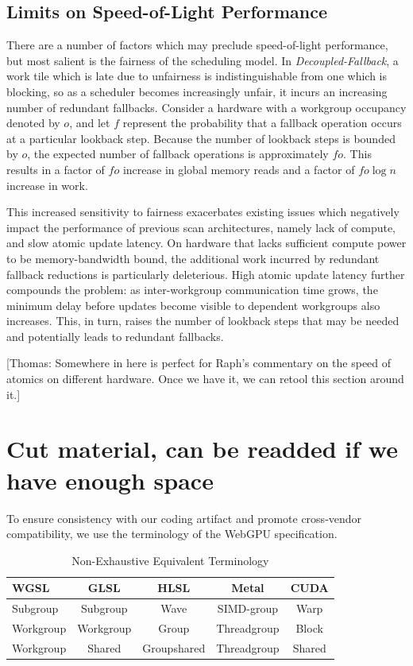 \documentclass[sigconf]{acmart}
\newcommand{\thomas}[1]{{\footnotesize\color{orange}[Thomas: #1]}}
\begin{document}
\subsection{Limits on Speed-of-Light Performance}
There are a number of factors which may preclude speed-of-light performance, but most salient is the fairness of the scheduling model. In \emph{Decoupled-Fallback}, a work tile which is late due to unfairness is indistinguishable from one which is blocking, so as a scheduler becomes increasingly unfair, it incurs an increasing number of redundant fallbacks. Consider a hardware with a workgroup occupancy denoted by $o$, and let $f$ represent the probability that a fallback operation occurs at a particular lookback step. Because the number of lookback steps is bounded by $o$, the expected number of fallback operations is approximately $fo$. This results in a factor of $fo$ increase in global memory reads and a factor of $fo\log{n}$ increase in work.

This increased sensitivity to fairness exacerbates existing issues which negatively impact the performance of previous scan architectures, namely lack of compute, and slow atomic update latency. On hardware that lacks sufficient compute power to be memory-bandwidth bound, the additional work incurred by redundant fallback reductions is particularly deleterious. High atomic update latency further compounds the problem: as inter-workgroup communication time grows, the minimum delay before updates become visible to dependent workgroups also increases. This, in turn, raises the number of lookback steps that may be needed and potentially leads to redundant fallbacks.

\thomas{Somewhere in here is perfect for Raph's commentary on the speed of atomics on different hardware. Once we have it, we can retool this section around it.}

\section{Cut material, can be readded if we have enough space}

To ensure consistency with our coding artifact and promote cross-vendor compatibility, we use the terminology of the WebGPU specification.
\setlength{\tabcolsep}{3pt}
\begin{table}[h]
  \centering
  \caption{Non-Exhaustive Equivalent Terminology}
  \label{tab:terminology}
  \begin{tabular}{lcccc}
    \toprule
    \textbf{WGSL} & \textbf{GLSL} & \textbf{HLSL} & \textbf{Metal} & \textbf{CUDA} \\ \midrule
    Subgroup      & Subgroup      & Wave          & SIMD-group     & Warp          \\
    Workgroup     & Workgroup     & Group         & Threadgroup    & Block         \\
    Workgroup     & Shared        & Groupshared   & Threadgroup    & Shared        \\ \bottomrule
  \end{tabular}
\end{table}
\end{document}
